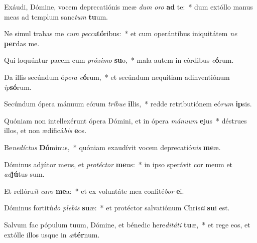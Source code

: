 \item Exáudi, Dómine, vocem deprecatiónis meæ \textit{dum} \textit{o}\textit{ro} \textbf{ad} te:~* dum extóllo manus meas ad templum sanc\textit{tum} \textbf{tu}um.
\item Ne simul trahas me \textit{cum} \textit{pec}\textit{ca}\textbf{tó}ribus:~* et cum operántibus iniquitátem \textit{ne} \textbf{per}das me.
\item Qui loquúntur pacem cum \textit{pró}\textit{xi}\textit{mo} \textbf{su}o,~* mala autem in córdibus \textit{e}\textbf{ó}rum.
\item Da illis secúndum ó\textit{pe}\textit{ra} \textit{e}\textbf{ó}rum,~* et secúndum nequítiam adinventiónum \textit{ip}\textbf{só}rum.
\item Secúndum ópera mánuum eórum \textit{trí}\textit{bu}\textit{e} \textbf{il}lis,~* redde retributiónem eó\textit{rum} \textbf{ip}sis.
\item Quóniam non intellexérunt ópera Dómini, et in ópera \textit{má}\textit{nu}\textit{um} \textbf{e}jus~* déstrues illos, et non ædificá\textit{bis} \textbf{e}os.
\item Be\textit{ne}\textit{díc}\textit{tus} \textbf{Dó}minus,~* quóniam exaudívit vocem deprecatió\textit{nis} \textbf{me}æ.
\item Dóminus adjútor meus, et \textit{pro}\textit{téc}\textit{tor} \textbf{me}us:~* in ipso sperávit cor meum et \textit{ad}\textbf{jú}tus sum.
\item Et reflóru\textit{it} \textit{ca}\textit{ro} \textbf{me}a:~* et ex voluntáte mea confité\textit{bor} \textbf{e}i.
\item Dóminus fortitú\textit{do} \textit{ple}\textit{bis} \textbf{su}æ:~* et protéctor salvatiónum Chris\textit{ti} \textbf{su}i est.
\item Salvum fac pópulum tuum, Dómine, et bénedic here\textit{di}\textit{tá}\textit{ti} \textbf{tu}æ,~* et rege eos, et extólle illos usque in \textit{æ}\textbf{tér}num.
